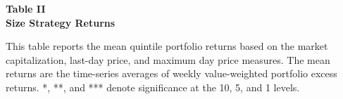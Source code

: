 \documentclass{article}
\begin{document}
    \begin{center}
        \textbf{
        Table II
        \\
        Size Strategy Returns
        }
    \end{center}
    \begin{justify}
        \footnotesize{
        This table reports the mean quintile portfolio returns based on the market capitalization, last-day price, and maximum day price measures. The mean returns are the time-series averages of weekly value-weighted portfolio excess returns. *, **, and *** denote significance at the 10, 5, and 1 levels.
        }
    \end{justify}
    \-
    \noindent{}
\end{document}
